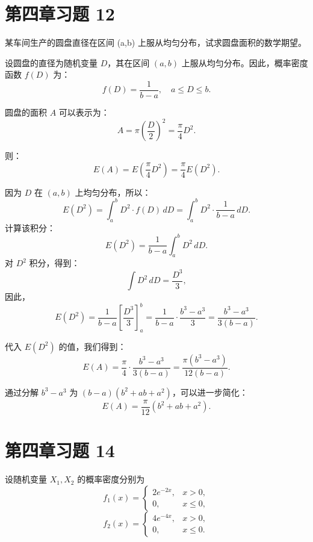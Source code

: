 \documentclass[twoside]{article}
\begin{document}
\section{第四章习题 12}

某车间生产的圆盘直径在区间 (a,b) 上服从均匀分布，试求圆盘面积的数学期望。

\begin{ans}{12}{12}

   设圆盘的直径为随机变量 \( D \)，其在区间 \( (a, b) \) 上服从均匀分布。因此，概率密度函数 \( f(D) \) 为：
   \[
   f(D) = \frac{1}{b - a}, \quad a \leq D \leq b.
   \]

   圆盘的面积 \( A \) 可以表示为：
   \[
   A = \pi \left( \frac{D}{2} \right)^2 = \frac{\pi}{4} D^2.
   \]

   则：
   \[
   E(A) = E\left( \frac{\pi}{4} D^2 \right) = \frac{\pi}{4} E(D^2).
   \]


   因为 \( D \) 在 \( (a, b) \) 上均匀分布，所以：
   \[
   E(D^2) = \int_{a}^{b} D^2 \cdot f(D) \, dD = \int_{a}^{b} D^2 \cdot \frac{1}{b - a} \, dD.
   \]
   计算该积分：
   \[
   E(D^2) = \frac{1}{b - a} \int_{a}^{b} D^2 \, dD.
   \]
   对 \( D^2 \) 积分，得到：
   \[
   \int D^2 \, dD = \frac{D^3}{3},
   \]
   因此，
   \[
   E(D^2) = \frac{1}{b - a} \left[ \frac{D^3}{3} \right]_{a}^{b} = \frac{1}{b - a} \cdot \frac{b^3 - a^3}{3} = \frac{b^3 - a^3}{3(b - a)}.
   \]


   代入 \( E(D^2) \) 的值，我们得到：
   \[
   E(A) = \frac{\pi}{4} \cdot \frac{b^3 - a^3}{3(b - a)} = \frac{\pi (b^3 - a^3)}{12(b - a)}.
   \]

   通过分解 \( b^3 - a^3 \) 为 \( (b - a)(b^2 + ab + a^2) \)，可以进一步简化：
   \[
   E(A) = \frac{\pi}{12} (b^2 + ab + a^2).
   \]
\end{ans}

\section{第四章习题 14}

设随机变量 \( X_1, X_2 \) 的概率密度分别为
\[
f_1(x) = 
\begin{cases}
2e^{-2x}, & x > 0, \\
0, & x \leq 0,
\end{cases}
\]
\[
f_2(x) = 
\begin{cases}
4e^{-4x}, & x > 0, \\
0, & x \leq 0.
\end{cases}
\]
\end{document}
